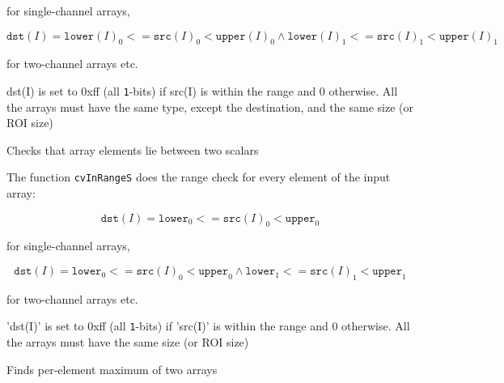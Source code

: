 for single-channel arrays,

\[
\texttt{dst}(I)=
\texttt{lower}(I)_0 <= \texttt{src}(I)_0 < \texttt{upper}(I)_0 \land
\texttt{lower}(I)_1 <= \texttt{src}(I)_1 < \texttt{upper}(I)_1
\]

for two-channel arrays etc.

dst(I) is set to 0xff (all \texttt{1}-bits) if src(I) is within the range and 0 otherwise. All the arrays must have the same type, except the destination, and the same size (or ROI size)


\label{InRangeS}

Checks that array elements lie between two scalars


\begin{description}
\end{description}


The function \texttt{cvInRangeS} does the range check for every element of the input array:

\[
\texttt{dst}(I)=\texttt{lower}_0 <= \texttt{src}(I)_0 < \texttt{upper}_0
\]

for single-channel arrays,

\[
\texttt{dst}(I)=
\texttt{lower}_0 <= \texttt{src}(I)_0 < \texttt{upper}_0 \land
\texttt{lower}_1 <= \texttt{src}(I)_1 < \texttt{upper}_1
\]

for two-channel arrays etc.

'dst(I)' is set to 0xff (all \texttt{1}-bits) if 'src(I)' is within the range and 0 otherwise. All the arrays must have the same size (or ROI size)

\label{Max}

Finds per-element maximum of two arrays


\begin{description}
\end{description}

